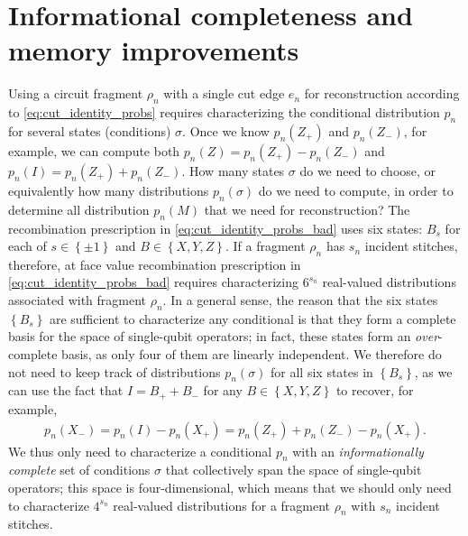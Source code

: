 \documentclass[nofootinbib,notitlepage,11pt]{revtex4-2}
\newcommand{\p}[1]{\left(#1\right)} %
\renewcommand{\set}[1]{\left\{#1\right\}} %
\begin{document}
\section{Informational completeness and memory improvements}
\label{sec:completeness}

Using a circuit fragment $\rho_n$ with a single cut edge $e_n$ for
reconstruction according to \eqref{eq:cut_identity_probs} requires
characterizing the conditional distribution $p_n$ for several states
(conditions) $\sigma$.  Once we know $p_n\p{Z_+}$ and $p_n\p{Z_-}$,
for example, we can compute both $p_n\p{Z}=p_n\p{Z_+}-p_n\p{Z_-}$ and
$p_n\p{I}=p_n\p{Z_+}+p_n\p{Z_-}$.  How many states $\sigma$ do we need
to choose, or equivalently how many distributions $p_n\p{\sigma}$ do
we need to compute, in order to determine all distribution $p_n\p{M}$
that we need for reconstruction?  The recombination prescription in
\eqref{eq:cut_identity_probs_bad} uses six states: $B_s$ for each of
$s\in\set{\pm1}$ and $B\in\set{X,Y,Z}$.  If a fragment $\rho_n$ has
$s_n$ incident stitches, therefore, at face value recombination
prescription in \eqref{eq:cut_identity_probs_bad} requires
characterizing $6^{s_n}$ real-valued distributions associated with
fragment $\rho_n$.  In a general sense, the reason that the six states
$\set{B_s}$ are sufficient to characterize any conditional is that
they form a complete basis for the space of single-qubit operators; in
fact, these states form an {\it over}-complete basis, as only four of
them are linearly independent.  We therefore do not need to keep track
of distributions $p_n\p{\sigma}$ for all six states in $\set{B_s}$, as
we can use the fact that $I=B_++B_-$ for any $B\in\set{X,Y,Z}$ to
recover, for example,
\begin{align}
  p_n\p{X_-}
  = p_n\p{I} - p_n\p{X_+}
  = p_n\p{Z_+} + p_n\p{Z_-} - p_n\p{X_+}.
  \label{eq:X-_expansion}
\end{align}
We thus only need to characterize a conditional $p_n$ with an {\it
  informationally complete} set of conditions $\sigma$ that
collectively span the space of single-qubit operators; this space is
four-dimensional, which means that we should only need to characterize
$4^{s_n}$ real-valued distributions for a fragment $\rho_n$ with $s_n$
incident stitches.
\end{document}
